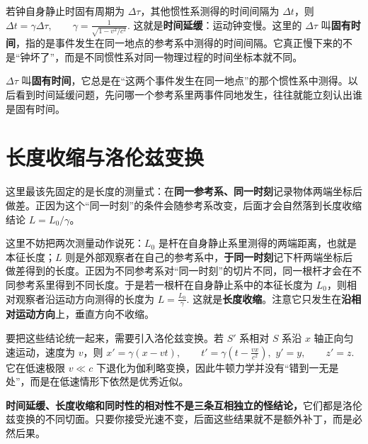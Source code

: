\documentclass[lang=cn,11pt]{elegantbook}
\newcommand{\bridge}[1]{\begin{note}#1\end{note}}
\begin{document}
\begin{center}
\end{center}

若钟自身静止时固有周期为 \(\Delta \tau\)，其他惯性系测得的时间间隔为 \(\Delta t\)，则
 \(\Delta t=\gamma \Delta \tau, \qquad \gamma=\frac{1}{\sqrt{1-v^2/c^2}}.\) 
这就是\textbf{时间延缓}：运动钟变慢。这里的 \(\Delta\tau\) 叫\textbf{固有时间}，指的是事件发生在同一地点的参考系中测得的时间间隔。它真正慢下来的不是“钟坏了”，而是不同惯性系对同一物理过程的时间坐标本就不同。

\begin{note}
\(\Delta \tau\) 叫\textbf{固有时间}，它总是在“这两个事件发生在同一地点”的那个惯性系中测得。以后看到时间延缓问题，先问哪一个参考系里两事件同地发生，往往就能立刻认出谁是固有时间。
\end{note}

\section{长度收缩与洛伦兹变换}

\bridge{这里最该先固定的是长度的测量式：在\textbf{同一参考系、同一时刻}记录物体两端坐标后做差。正因为这个“同一时刻”的条件会随参考系改变，后面才会自然落到长度收缩结论 \(L=L_0/\gamma\)。}

这里不妨把两次测量动作说死：\(L_0\) 是杆在自身静止系里测得的两端距离，也就是本征长度；\(L\) 则是外部观察者在自己的参考系中，\textbf{于同一时刻}记下杆两端坐标后做差得到的长度。正因为不同参考系对“同一时刻”的切片不同，同一根杆才会在不同参考系里得到不同长度。于是若一根杆在自身静止系中的本征长度为 \(L_0\)，则相对观察者沿运动方向测得的长度为
 \(L=\frac{L_0}{\gamma}.\) 
这就是\textbf{长度收缩}。注意它只发生在\textbf{沿相对运动方向}上，垂直方向不收缩。

要把这些结论统一起来，需要引入洛伦兹变换。若 \(S'\) 系相对 \(S\) 系沿 \(x\) 轴正向匀速运动，速度为 \(v\)，则
 \(x'=\gamma(x-vt),\qquad t'=\gamma\left(t-\frac{vx}{c^2}\right),\) 
 \(y'=y,\qquad z'=z.\) 
它在低速极限 \(v\ll c\) 下退化为伽利略变换，因此牛顿力学并没有“错到一无是处”，而是在低速情形下依然是优秀近似。

\begin{note}
\textbf{时间延缓、长度收缩和同时性的相对性不是三条互相独立的怪结论，}它们都是洛伦兹变换的不同切面。只要你接受光速不变，后面这些结果就不是额外补丁，而是必然后果。
\end{note}
\end{document}
